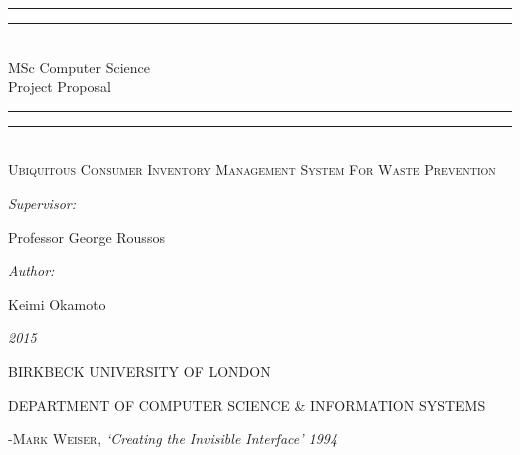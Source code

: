 \documentclass[a4paper, 11pt]{article}
\newlength{\drop}
\begin{document}
  \begin{titlepage}
    \textheight
    \centering
    \vspace*{\baselineskip}
    \rule{\textwidth}{1.6pt}\vspace*{-\baselineskip}\vspace*{2pt}
    \rule{\textwidth}{0.4pt}\\[\baselineskip]
    {\Large{MSc Computer Science\\[0.3\baselineskip] }} 	
    {\huge{Project Proposal\\[0.3\baselineskip] }}
	
    \rule{\textwidth}{0.4pt}\vspace*{-\baselineskip}\vspace{3.2pt}
    \rule{\textwidth}{1.6pt}
    \\[\baselineskip]
    \scshape
    {\Large Ubiquitous Consumer Inventory Management System For Waste Prevention\\}
    \vspace*{2\baselineskip}
    {\normalsize\emph{Supervisor: }{\large Professor George Roussos\par}}
    {\normalsize\emph{Author: }{\large Keimi Okamoto\par}}
    
    {\itshape 2015}
    \vfill
    {\large BIRKBECK UNIVERSITY OF LONDON\par}
{\footnotesize DEPARTMENT OF COMPUTER SCIENCE \& INFORMATION SYSTEMS}\par
  \end{titlepage}
  
\tableofcontents
\clearpage

\centering
\setlength{\epigraphwidth}{1\textwidth\centering}
\epigraph{}
{\textsc{-Mark Weiser,}\textit{ `Creating the Invisible Interface' 1994}}
\end{document}
